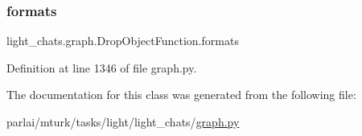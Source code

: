 \subsubsection{\texorpdfstring{formats}{formats}}
{\footnotesize\ttfamily light\+\_\+chats.\+graph.\+Drop\+Object\+Function.\+formats}



Definition at line 1346 of file graph.\+py.



The documentation for this class was generated from the following file\+:\begin{DoxyCompactItemize}
\item 
parlai/mturk/tasks/light/light\+\_\+chats/\hyperlink{parlai_2mturk_2tasks_2light_2light__chats_2graph_8py}{graph.\+py}\end{DoxyCompactItemize}
